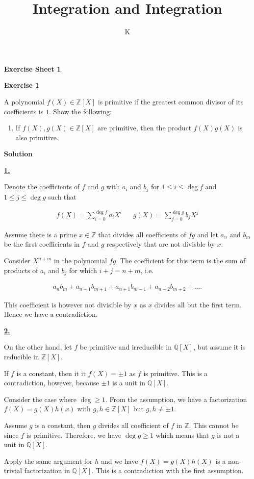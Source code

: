 \documentclass[a4paper]{article}
\title{Integration and Integration}
\author{K}
\theoremstyle{definition}
\begin{document}
\begin{center}
    \noindent\textbf{Exercise Sheet 1}
\end{center}
\noindent\textbf{Exercise 1}

\noindent A polynomial \(f(X) \in \mathbb{Z}[X]\) is primitive if the greatest common divisor of its coefficients is \(1\). Show the following:
\begin{enumerate}
    \item If \(f(X), g(X) \in \mathbb{Z}[X]\) are primitive, then the product \(f(X)g(X)\) is also primitive.
\end{enumerate}

\noindent\textbf{Solution}

\noindent\underline{\textbf{1.}}

\noindent Denote the coefficients of \(f\) and \(g\) with \(a_i\) and \(b_j\) for \(1 \leq i \leq \deg f\) and \(1 \leq j \leq \deg g\) such that

\begin{align}
    f(X) = \sum_{i = 0}^{\deg f} a_i X^i && g(X) = \sum_{j = 0}^{\deg g} b_j X^j
\end{align}

\noindent Assume there is a prime \(x \in \mathbb{Z}\) that divides all coefficients of \(fg\) and let \(a_n\) and \(b_m\) be the first coefficients in \(f\) and \(g\) respectively that are not divisble by \(x\).

\noindent Consider \(X^{n + m}\) in the polynomial \(fg\). The coefficient for this term is the sum of products of \(a_i\) and \(b_j\) for which \(i + j = n + m\), i.e.

\begin{align}
    a_n b_m + a_{n - 1} b_{m+1} + a_{n + 1} b_{m - 1} + a_{n - 2} b_{m + 2} + \dots \text{.}
\end{align}

\noindent This coefficient is however not divisible by \(x\) as \(x\) divides all but the first term. Hence we have a contradiction.

\noindent \underline{\textbf{2.}}

\noindent On the other hand, let \(f\) be primitive and irreducible in \(\mathbb{Q}[X]\), but assume it is reducible in \(\mathbb{Z}[X]\).

If \(f\) is a constant, then it it \(f(X) = \pm 1\) as \(f\) is primitive. This is a contradiction, however, because \(\pm 1\) is a unit in \(\mathbb{Q}[X]\).

Consider the case where \(\deg \geq 1\). From the assumption, we have a factorization \(f(X) = g(X)h(x)\) with \(g, h \in \mathbb{Z}[X]\) but \(g, h \neq \pm 1\).

Assume \(g\) is a constant, then \(g\) divides all coefficient of \(f\) in \(\mathbb{Z}\). This cannot be since \(f\) is primitive. Therefore, we have \(\deg g \geq 1\) which means that \(g\) is not a unit in \(\mathbb{Q}[X]\).

Apply the same argument for \(h\) and we have \(f(X) = g(X)h(X)\) is a non-trivial factorization in \(\mathbb{Q}[X]\). This is a contradiction with the first assumption.
\end{document}
